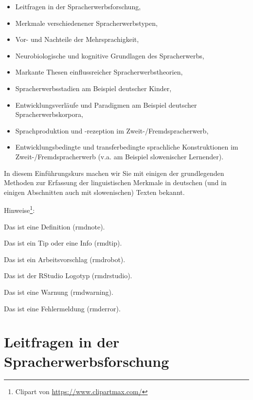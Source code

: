 \documentclass[
  letterpaper,
]{scrbook}
\providecommand{\tightlist}{%
  \setlength{\itemsep}{0pt}\setlength{\parskip}{0pt}}\usepackage{longtable,booktabs,array}
\begin{document}
\begin{itemize}
\tightlist
\item
  Leitfragen in der Spracherwerbsforschung,\\
\item
  Merkmale verschiedenener Spracherwerbstypen,\\
\item
  Vor- und Nachteile der Mehrsprachigkeit,\\
\item
  Neurobiologische und kognitive Grundlagen des Spracherwerbs,\\
\item
  Markante Thesen einflussreicher Spracherwerbstheorien,\\
\item
  Spracherwerbsstadien am Beispiel deutscher Kinder,\\
\item
  Entwicklungsverläufe und Paradigmen am Beispiel deutscher
  Spracherwerbskorpora,\\
\item
  Sprachproduktion und -rezeption im Zweit-/Fremdspracherwerb,\\
\item
  Entwicklungsbedingte und transferbedingte sprachliche Konstruktionen
  im Zweit-/Fremdspracherwerb (v.a. am Beispiel slowenischer
  Lernender).\\
\end{itemize}

In diesem Einführungskurs machen wir Sie mit einigen der grundlegenden
Methoden zur Erfassung der linguistischen Merkmale in deutschen (und in
einigen Abschnitten auch mit slowenischen) Texten bekannt.

Hinweise\footnote{Clipart von \url{https://www.clipartmax.com/}}:

Das ist eine Definition (rmdnote).

Das ist ein Tip oder eine Info (rmdtip).

Das ist ein Arbeitsvorschlag (rmdrobot).

Das ist der RStudio Logotyp (rmdrstudio).

Das ist eine Warnung (rmdwarning).

Das ist eine Fehlermeldung (rmderror).

\hypertarget{sec-gegenstand}{%
\chapter{Leitfragen in der
Spracherwerbsforschung}\label{sec-gegenstand}}
\end{document}

